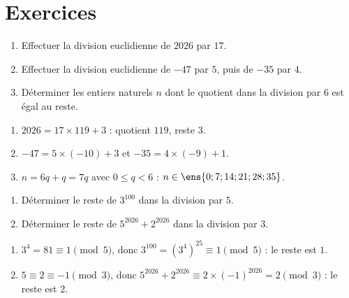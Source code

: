 \mxnewpage
\section{Exercices}
\begin{exercise}
\begin{enumerate}
\item Effectuer la division euclidienne de $\num{2026}$ par $17$.
\item Effectuer la division euclidienne de $-47$ par $5$, puis de $-35$ par $4$.
\item Déterminer les entiers naturels $n$ dont le quotient dans la division par $6$ est égal au reste.
\end{enumerate}
\end{exercise}
\begin{solution}
\begin{enumerate}
\item $\num{2026}=17\times119+3$ : quotient $119$, reste $3$.
\item $-47=5\times(-10)+3$ et $-35=4\times(-9)+1$.
\item $n=6q+q=7q$ avec $0\le q<6$ : $n\in\ens{0;7;14;21;28;35}$.
\end{enumerate}
\end{solution}

\begin{exercise}
\begin{enumerate}
\item Déterminer le reste de $3^{100}$ dans la division par $5$.
\item Déterminer le reste de $5^{2026}+2^{2026}$ dans la division par $3$.
\end{enumerate}
\end{exercise}
\begin{solution}
\begin{enumerate}
\item $3^4=81\equiv1\pmod5$, donc $3^{100}=\left(3^4\right)^{25}\equiv1\pmod5$ : le reste est $1$.
\item $5\equiv2\equiv-1\pmod3$, donc $5^{2026}+2^{2026}\equiv2\times(-1)^{2026}=2\pmod3$ : le reste est $2$.
\end{enumerate}
\end{solution}


